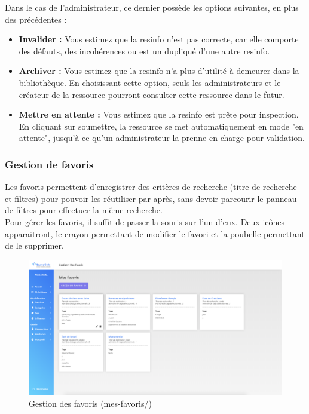 Dans le cas de l'administrateur, ce dernier possède les options suivantes, en plus des précédentes :

\begin{itemize}
    \item \textbf{Invalider :} Vous estimez que la \gls{resinfo} n'est pas correcte, car elle comporte des défauts, des incohérences ou est un dupliqué d'une autre \gls{resinfo}.
    \item \textbf{Archiver :} Vous estimez que la \gls{resinfo} n'a plus d'utilité à demeurer dans la bibliothèque. En choisissant cette option, seuls les administrateurs et le créateur de la ressource pourront consulter cette ressource dans le futur.
    \item \textbf{Mettre en attente :} Vous estimez que la \gls{resinfo} est prête pour inspection. En cliquant sur soumettre, la ressource se met automatiquement en mode "en attente", jusqu'à ce qu'un administrateur la prenne en charge pour validation.
\end{itemize}

\subsubsection{Gestion de favoris}
\label{section:gestionFavorite}

Les favoris permettent d'enregistrer des critères de recherche (titre de recherche et filtres) pour pouvoir les réutiliser par après, sans devoir parcourir le panneau de filtres pour effectuer la même recherche.\\

Pour gérer les favoris, il suffit de passer la souris sur l'un d'eux. Deux icônes apparaitront, le crayon permettant de modifier le favori et la poubelle permettant de le supprimer.

\begin{figure}[H]
    \includegraphics[width=\textwidth,height=\textheight,keepaspectratio]{images/client/gestion-favorite.png}
    \caption[SourceCode : gestion des favoris]{Gestion des favoris (mes-favoris/)}
\end{figure}

